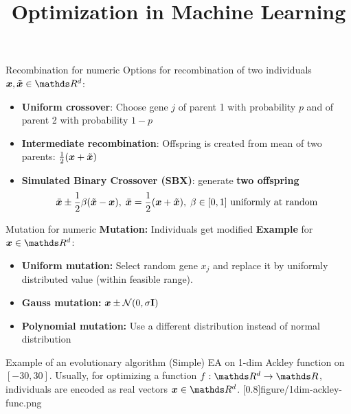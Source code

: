 \documentclass[11pt,compress,t,notes=noshow, xcolor=table]{beamer}
\title{Optimization in Machine Learning}
\begin{document}

\begin{framev}{Recombination for numeric}
Options for recombination of two individuals $\xv, \tilde{\xv} \in \R^d$:
\begin{itemize}
\item \textbf{Uniform crossover}: Choose gene $j$ of parent 1 with probability $p$ and of parent 2 with probability $1-p$
\item \textbf{Intermediate recombination}: Offspring is created from mean of two parents: $\frac{1}{2}(\bm{x} + \tilde{\bm{x}})$
\item \textbf{Simulated Binary Crossover (SBX)}: generate \textbf{two offspring}
$$
\bar{\bm{x}} \pm \frac{1}{2} \beta (\tilde{\bm{x}} - \bm{x}), \; \bar{\bm{x}} = \frac{1}{2} (\bm{x} + \tilde{\bm{x}}), \; \text{$\beta \in [0, 1]$ uniformly at random}
$$
\end{itemize}
\vfill
{}
\end{framev}


\begin{framev}[fs=footnotesize]{Mutation for numeric}
\textbf{Mutation:} Individuals get modified
\medskip
\textbf{Example} for $\xv \in \R^d$:
\begin{itemize}
\item \textbf{Uniform mutation:} Select random gene $x_j$ and replace it by uniformly distributed value (within feasible range).
\item \textbf{Gauss mutation:} $\bm{x} \pm \mathcal{N}(0, \sigma \mathbf{I})$
\item \textbf{Polynomial mutation:} Use a different distribution instead of normal distribution
\end{itemize}
\vfill
{}
\end{framev}


\begin{framev}[align=top, fs=small]{Example of an evolutionary algorithm}
(Simple) EA on 1-dim Ackley function on $[-30, 30]$.
Usually, for optimizing a function $f : \R^d \to \R$, individuals are encoded as real vectors $\xv \in \R^d$.
\imageFixed{2.5cm}{2.5cm}[0.8]{figure/1dim-ackley-func.png}
\end{framev}
\end{document}
